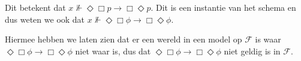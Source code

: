 \documentclass[a4paper,11pt]{article}
\begin{document}
\begin{description}
Dit betekent dat $x \not \Vdash \Diamond \Box p \rightarrow \Box \Diamond p$.
Dit is een instantie van het schema en dus weten we ook dat
$x \not \Vdash \Diamond \Box \phi \rightarrow \Box \Diamond \phi$.

Hiermee hebben we laten zien dat er een wereld in een model op $\mathcal{F}$
is waar $\Diamond \Box \phi \rightarrow \Box \Diamond \phi$ niet waar is, dus dat
$\Diamond \Box \phi \rightarrow \Box \Diamond \phi$ niet geldig is in $\mathcal{F}$.

\end{description}
\end{document}
